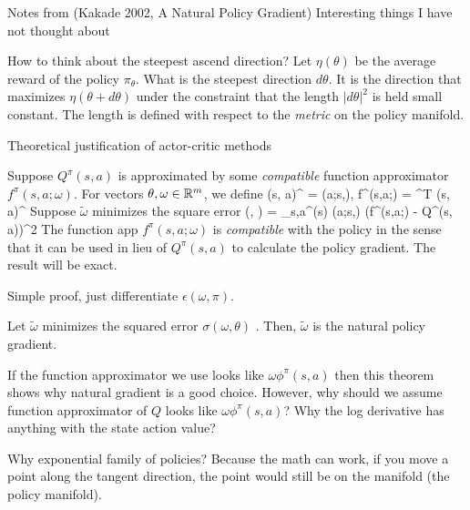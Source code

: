 \documentclass{article}
\let\[\relax \let\]\relax %
\DeclareRobustCommand{\[}{\begin{equation}}
\DeclareRobustCommand{\]}{\end{equation}}
\begin{document}
Notes from (Kakade 2002, A Natural Policy Gradient)
Interesting things I have not thought about

How to think about the steepest ascend direction? Let $\eta(\theta)$ be the average
reward of the policy $\pi_{\theta}$. What is the steepest direction
$d\theta$. It is the direction that maximizes $\eta(\theta + d\theta)$
under the constraint that the length $|d\theta|^2$ is held small constant. 
The length is defined with respect to the \emph{metric} on the policy 
manifold. 

Theoretical justification of actor-critic methods

Suppose $Q^{\pi}(s, a)$ is approximated by some \emph{compatible} function
approximator $f^{\pi}(s, a; \omega)$. For vectors $\theta, \omega 
\in \mathbb{R}^m$, we define
\[
\phi(s, a)^{\pi} = \nabla \log \pi(a;s,\theta),
f^{\pi}(s,a;\omega) = \omega^{T} \phi(s, a)^{\pi}
\]
Suppose $\tilde \omega$ minimizes the square error 
\[
\epsilon(\omega, \pi) = \sum_{s,a}\rho^{\pi}(s) \pi(a;s,\theta)
(f^{\pi}(s,a;\omega) - Q^{\pi}(s, a))^2
\]
The function app $f^{\pi}(s,a;\omega)$ is \emph{compatible} with the
policy in the sense that it can be used in lieu of $Q^{\pi}(s, a)$ 
to calculate the policy gradient. The result will be exact. 

Simple proof, just differentiate $\epsilon(\omega, \pi)$. 

\begin{theorem}
Let $\tilde \omega$ minimizes the squared error $\sigma(\omega, \theta)$
. Then, $\tilde \omega$ is the natural policy gradient. 
\end{theorem}

If the function approximator we use looks like $\omega\phi^{\pi}(s, a)$
then this theorem shows why natural gradient is a good choice. 
However, why should we assume function approximator of $Q$ looks like
$\omega\phi^{\pi}(s, a)$? Why the log derivative has anything with the
state action value? 

Why exponential family of policies? Because the math can work, if 
you move a point along the tangent direction, the point would still 
be on the manifold (the policy manifold). 
\end{document}
